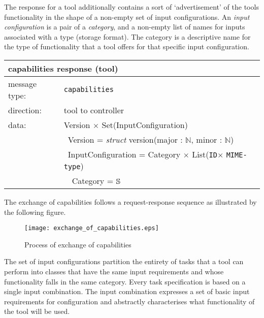 \documentclass{article}
\newcommand{\msg}[1]{\texttt{#1}}
\newcommand{\String}{\ensuremath \mathbb{S}\xspace}
\newcommand{\Id}{\texttt{ID}\xspace}
\newcommand{\MIMEtype}{\texttt{MIME-type}\xspace}
\begin{document}
   \noindent The response for a tool additionally contains a sort of
   `advertisement' of the tools functionality in the shape of a non-empty set
   of input configurations.  An \textit{input configuration} is a pair of a
   \textit{category}, and a non-empty list of names for inputs associated with
   a type (storage format).  The category is a descriptive name for the type of
   functionality that a tool offers for that specific input configuration.

   \begin{table}[H]
    \begin{center}
     \begin{tabular}{|ll|}
      \hline
       \multicolumn{2}{|l|}{\textbf{capabilities response (tool)}} \\
      \hline
       message type:   & \msg{capabilities} \\
      \hline
       direction:      & tool to controller \\
      \hline
       data:           & Version $\times$ Set(InputConfiguration) \\
                       & \ Version = \textit{struct} version(major : $\mathbb{N}$, minor : $\mathbb{N}$) \\
                       & \ InputConfiguration = Category $\times$ List(\Id $\times$ \MIMEtype) \\
                       & \ \ Category = $\String$ \\
      \hline
     \end{tabular}
    \end{center}
    \vspace{-0.5cm}
   \end{table}

   \noindent The exchange of capabilities follows a request-response sequence
   as illustrated by the following figure.

   \begin{figure}[H]
    \vspace{-0.4cm}
    \begin{center}
     \texttt{[image: exchange\_of\_capabilities.eps]}
    \end{center}
    \vspace{-0.7cm}
    \caption{Process of exchange of capabilities}
   \end{figure}

   \noindent The set of input configurations partition the entirety of tasks
   that a tool can perform into classes that have the same input requirements
   and whose functionality falls in the same category. Every task specification
   is based on a single input combination. The input combination expresses a
   set of basic input requirements for configuration and abstractly
   characterises what functionality of the tool will be used.
\end{document}
